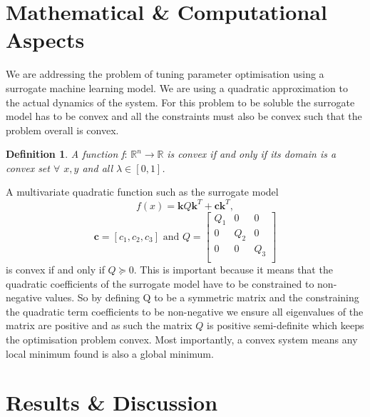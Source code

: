 \documentclass[conference]{IEEEtran}
\theoremstyle{definition}
\newtheorem{definition}{Definition}[section]
\begin{document}
\section{Mathematical \& Computational Aspects}
\noindent We are addressing the problem of tuning parameter optimisation using a surrogate machine learning model. We are using a quadratic approximation to the actual dynamics of the system. For this problem to be soluble the surrogate model has to be convex and all the constraints must also be convex such that the problem overall is convex. \\
\theoremstyle{definition}
\begin{definition}
\textit{A function f}: $\mathbb{R}^n \rightarrow \mathbb{R}$ \textit{is convex if and only if its domain is a convex set $\forall$ $x, y$ and all $\lambda \in [0,1]$. } 
\end{definition}
\noindent A multivariate quadratic function such as the surrogate model
\begin{equation}
    f(x) = \mathbf{k}Q\mathbf{k}^T + \mathbf{c}\mathbf{k}^T,
\end{equation}
\begin{equation}
    \mathbf{c} = [c_1, c_2, c_3] \textrm{ and } Q = \begin{bmatrix}
                                                    Q_1 & 0 & 0 \\
                                                    0 & Q_2 & 0 \\
                                                    0 & 0 & Q_3 \\
                                                    \end{bmatrix}
\end{equation}
is convex if and only if $Q \succcurlyeq 0$. This is important because it means that the quadratic coefficients of the surrogate model have to be constrained to non-negative values. So by defining Q to be a symmetric matrix and the constraining the quadratic term coefficients to be non-negative we ensure all eigenvalues of the matrix are positive and as such the matrix $Q$ is positive semi-definite which keeps the optimisation problem convex. Most importantly, a convex system means any local minimum found is also a global minimum. 


\section{Results \& Discussion}
\end{document}
